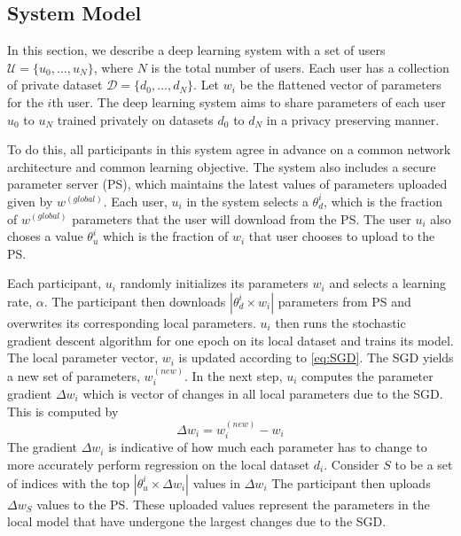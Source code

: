 \documentclass[conference]{IEEEtran}
\begin{document}
\subsection{System Model} \label{sec:systemModel}

In this section, we describe a deep learning system with a set of users $\mathcal{U}= \{u_0, \dots,u_N\}$, where $N$ is the total
number of
users. Each user has a collection of
private dataset  $\mathcal{D}= \{d_0, \dots,d_N\}$. 
Let $w_i$ be the flattened vector of parameters for the $i$th user. The
deep learning system aims to share parameters of each user $u_0$ to $u_N$  trained privately on datasets $d_0$ to $d_N$ in a privacy
preserving manner.

To do this, all participants in this system agree in advance on a
common network architecture and common learning objective. The system also includes a secure parameter server (PS), which maintains the
latest values of parameters uploaded given by $w^{(global)}$. Each user, $u_i$ in the system selects a $\theta_d^{i}$, which is the fraction of  $w^{(global)}$ parameters that the user will download from the PS. 
The user $u_i$ also choses a value $\theta_u^{i}$ which is the fraction of $w_i$ that user chooses to upload to the PS.

Each participant, $u_i$ randomly initializes its parameters $w_i$ and selects a learning rate, $\alpha$.
The participant then downloads $|\theta_d^{i} \times w_i|$ parameters from PS and overwrites its corresponding local parameters.
$u_i$ then runs the stochastic gradient descent algorithm for one epoch on its local dataset and trains its model. The local parameter vector, $w_i$ is updated according to \eqref{eq:SGD}. The SGD yields a new set of parameters, $w_i^{(new)}$.
In the next step, $u_i$ computes the parameter gradient $\Delta w_i$ which is vector of changes in all local parameters due to the SGD. This is computed by
$$\Delta w_i =  w_i^{(new)} -  w_i$$ 
The gradient  $\Delta w_i$ is indicative of how much each parameter has to change to more accurately perform regression on the local dataset $d_i$.
Consider $S$ to be a set of indices with the top  $|\theta_u^{i} \times \Delta w_i|$ values in $\Delta w_i$ 
The participant then uploads  $\Delta w_S$ values to the PS.
These uploaded values represent the parameters in the local model that have undergone the largest changes due to the SGD. 
\end{document}

